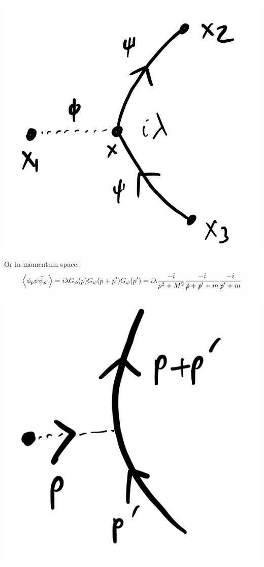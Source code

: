 \begin{center}
    \includegraphics[scale=0.35]{Lectures/Images/lec6-xfeynman.png}
\end{center}

Or in momentum space:
\begin{equation}
    \left< \phi_p\psi \bar{\psi}_{p'} \right> = i\lambda G_\phi(p)G_{\psi}(p + p')G_\psi(p') = i\lambda \frac{-i}{p^2 +M^2}\frac{-i}{\slashed{p} + \slashed{p}' + m}\frac{-i}{\slashed{p}' + m}
\end{equation}

\begin{center}
    \includegraphics[scale=0.35]{Lectures/Images/lec6-pfeynman.png}
\end{center}


